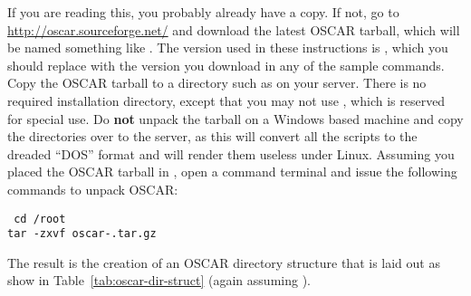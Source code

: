 If you are reading this, you probably already have a copy. If not, go
to \url{http://oscar.sourceforge.net/} and download the latest OSCAR
tarball, which will be named something like
.  The version used in these
instructions is \oscarversion, which you should replace with the
version you download in any of the sample commands. Copy the OSCAR
tarball to a directory such as  on your server.  There is
no required installation directory, except that you may not use
, which is reserved for special use. Do {\bf
  not} unpack the tarball on a Windows based machine and copy the
directories over to the server, as this will convert all the scripts
to the dreaded ``DOS'' format and will render them useless under
Linux.  Assuming you placed the OSCAR tarball in , open a
command terminal and issue the following commands to unpack OSCAR:

\vspace{11pt}
{\tt
  cd /root \\
\indent  tar -zxvf oscar-\oscarversion.tar.gz
}
\vspace{11pt}
    
The result is the creation of an OSCAR directory structure that is
laid out as show in Table~\ref{tab:oscar-dir-struct} (again assuming
).

